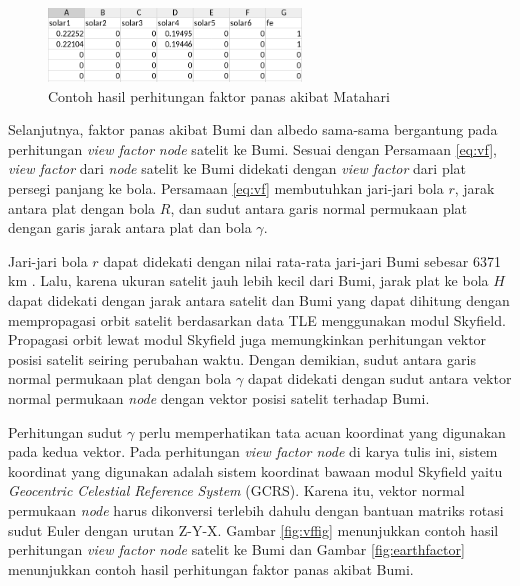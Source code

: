 \begin{figure}[H]
\setlength{}
\begin{center}
\includegraphics[width=0.6\textwidth]{fig/solarfactor.png}
\caption{Contoh hasil perhitungan faktor panas akibat Matahari}
\label{fig:solarfactor}
\end{center}
\end{figure}

Selanjutnya, faktor panas akibat Bumi dan albedo sama-sama bergantung pada
perhitungan \textit{view factor} \textit{node} satelit ke Bumi. Sesuai dengan
Persamaan \ref{eq:vf}, \textit{view factor} dari \textit{node} satelit ke Bumi
didekati dengan \textit{view factor} dari plat persegi panjang ke bola. Persamaan \ref{eq:vf} membutuhkan jari-jari bola $r$, jarak antara plat dengan bola $R$, dan sudut antara garis normal permukaan plat dengan garis jarak antara plat dan bola $\gamma$. 

Jari-jari bola $r$ dapat didekati dengan nilai rata-rata jari-jari Bumi sebesar
6371 km \cite{moritz}. Lalu, karena ukuran satelit jauh lebih kecil dari Bumi,
jarak plat ke bola $H$ dapat didekati dengan jarak antara satelit dan Bumi yang
dapat dihitung dengan mempropagasi orbit satelit berdasarkan data TLE
menggunakan modul Skyfield. Propagasi orbit lewat modul Skyfield juga
memungkinkan perhitungan vektor posisi satelit seiring perubahan waktu. Dengan
demikian, sudut antara garis normal permukaan plat dengan bola $\gamma$ dapat
didekati dengan sudut antara vektor normal permukaan \textit{node} dengan
vektor posisi satelit terhadap Bumi. 

Perhitungan sudut $\gamma$ perlu memperhatikan tata acuan koordinat yang
digunakan pada kedua vektor. Pada perhitungan \textit{view factor node} di
karya tulis ini, sistem koordinat yang digunakan adalah sistem koordinat bawaan
modul Skyfield yaitu \textit{Geocentric Celestial Reference System} (GCRS).
Karena itu, vektor normal permukaan \textit{node} harus dikonversi terlebih
dahulu dengan bantuan matriks rotasi sudut Euler dengan urutan Z-Y-X. Gambar
\ref{fig:vffig} menunjukkan contoh hasil perhitungan \textit{view factor node}
satelit ke Bumi dan Gambar \ref{fig:earthfactor} menunjukkan contoh hasil perhitungan faktor panas akibat Bumi.

